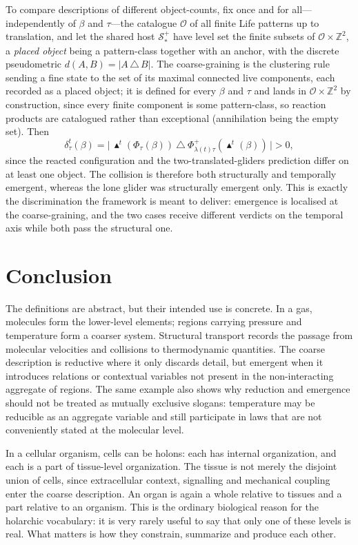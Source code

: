 \documentclass[runningheads]{llncs}
\begin{document}
To compare descriptions of different object-counts, fix once and for all---independently of $\beta$ and $\tau$---the catalogue $\mathcal O$ of all finite Life patterns up to translation, and let the shared host $\mathcal S^{+}_{\ast}$ have level set the finite subsets of $\mathcal O\times\mathbb Z^2$, a \emph{placed object} being a pattern-class together with an anchor, with the discrete pseudometric $d(A,B)=|A\,\triangle\,B|$. The coarse-graining is the clustering rule sending a fine state to the set of its maximal connected live components, each recorded as a placed object; it is defined for every $\beta$ and $\tau$ and lands in $\mathcal O\times\mathbb Z^2$ by construction, since every finite component is some pattern-class, so reaction products are catalogued rather than exceptional (annihilation being the empty set). Then
\[
\delta^t_\tau(\beta)=\bigl|\,\blacktriangle^t(\Phi_\tau(\beta))\ \triangle\ \Phi^{+}_{\lambda(t)\tau}(\blacktriangle^t(\beta))\,\bigr|>0,
\]
since the reacted configuration and the two-translated-gliders prediction differ on at least one object. The collision is therefore both structurally and temporally emergent, whereas the lone glider was structurally emergent only. This is exactly the discrimination the framework is meant to deliver: emergence is localised at the coarse-graining, and the two cases receive different verdicts on the temporal axis while both pass the structural one.

\section{Conclusion}

The definitions are abstract, but their intended use is concrete. In a gas, molecules form the lower-level elements; regions carrying pressure and temperature form a coarser system. Structural transport records the passage from molecular velocities and collisions to thermodynamic quantities. The coarse description is reductive where it only discards detail, but emergent when it introduces relations or contextual variables not present in the non-interacting aggregate of regions. The same example also shows why reduction and emergence should not be treated as mutually exclusive slogans: temperature may be reducible as an aggregate variable and still participate in laws that are not conveniently stated at the molecular level.

In a cellular organism, cells can be holons: each has internal organization, and each is a part of tissue-level organization. The tissue is not merely the disjoint union of cells, since extracellular context, signalling and mechanical coupling enter the coarse description. An organ is again a whole relative to tissues and a part relative to an organism. This is the ordinary biological reason for the holarchic vocabulary: it is very rarely useful to say that only one of these levels is real. What matters is how they constrain, summarize and produce each other.
\end{document}
